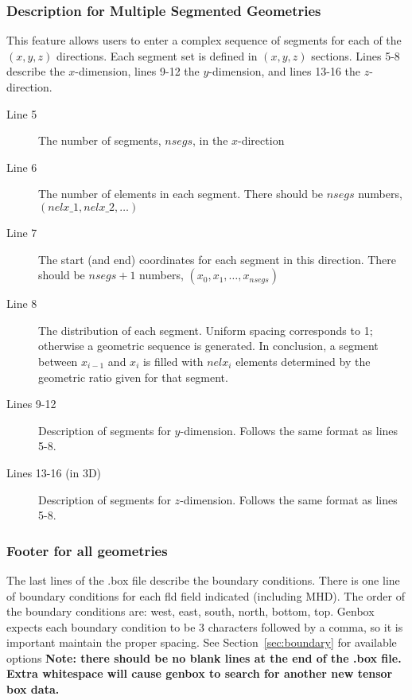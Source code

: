 \subsubsection{Description for Multiple Segmented Geometries}

This feature allows users to enter a complex sequence of segments for each of
the $(x,y,z)$ directions. Each segment set is defined in $(x,y,z)$ sections.
Lines 5-8 describe the $x$-dimension, lines 9-12 the $y$-dimension,
and lines 13-16 the $z$-direction.

\begin{description}

  \item[Line 5] The number of segments, $nsegs$, in the $x$-direction

  \item[Line 6] The number of elements in each segment. There should be $nsegs$
    numbers, $(nelx\_1, nelx\_2, \ldots)$

  \item[Line 7] The start (and end) coordinates for each segment in this
    direction.  There should be $nsegs+1$ numbers, $(x_0, x_1, \ldots,
    x_{nsegs})$

  \item[Line 8] The distribution of each segment. Uniform spacing corresponds
    to 1; otherwise a geometric sequence is generated.  In conclusion, a
    segment between $x_{i-1}$ and $x_i$ is filled with $nelx_i$ elements
    determined by the geometric ratio given for that segment.

  \item[Lines 9-12] Description of segments for $y$-dimension.  Follows the
    same format as lines 5-8.

  \item[Lines 13-16 (in 3D)] Description of segments for $z$-dimension.
    Follows the same format as lines 5-8.

\end{description}

\subsubsection{Footer for all geometries}

The last lines of the .box file describe the boundary conditions.  There is one
line of boundary conditions for each fld field indicated (including MHD).  The
order of the boundary conditions are: west, east, south, north, bottom, top.
Genbox expects each boundary condition to be 3 characters followed by a comma,
so it is important maintain the proper spacing.  See Section~\ref{sec:boundary}
for available options \textbf{Note: there should be no blank lines at the end
  of the .box file.  Extra whitespace will cause genbox to search for another
new tensor box data.}


